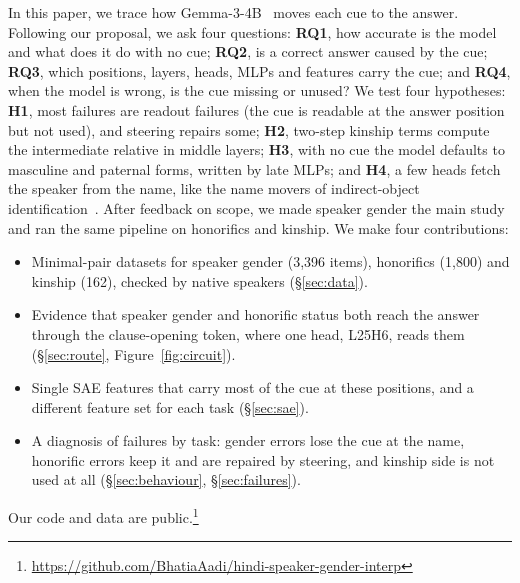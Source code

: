 \documentclass[11pt]{article}
\begin{document}
In this paper, we trace how Gemma-3-4B~\cite{gemma3} moves each cue to the answer. Following our proposal, we ask four questions: \textbf{RQ1}, how accurate is the model and what does it do with no cue; \textbf{RQ2}, is a correct answer caused by the cue; \textbf{RQ3}, which positions, layers, heads, MLPs and features carry the cue; and \textbf{RQ4}, when the model is wrong, is the cue missing or unused? We test four hypotheses: \textbf{H1}, most failures are readout failures (the cue is readable at the answer position but not used), and steering repairs some; \textbf{H2}, two-step kinship terms compute the intermediate relative in middle layers; \textbf{H3}, with no cue the model defaults to masculine and paternal forms, written by late MLPs; and \textbf{H4}, a few heads fetch the speaker from the name, like the name movers of indirect-object identification~\cite{wang2022}. After feedback on scope, we made speaker gender the main study and ran the same pipeline on honorifics and kinship. We make four contributions:
\begin{itemize}[leftmargin=*,itemsep=1pt,topsep=2pt]
\item Minimal-pair datasets for speaker gender (3,396 items), honorifics (1,800) and kinship (162), checked by native speakers (\S\ref{sec:data}).
\item Evidence that speaker gender and honorific status both reach the answer through the clause-opening token, where one head, L25H6, reads them (\S\ref{sec:route}, Figure~\ref{fig:circuit}).
\item Single SAE features that carry most of the cue at these positions, and a different feature set for each task (\S\ref{sec:sae}).
\item A diagnosis of failures by task: gender errors lose the cue at the name, honorific errors keep it and are repaired by steering, and kinship side is not used at all (\S\ref{sec:behaviour}, \S\ref{sec:failures}).
\end{itemize}
Our code and data are public.\footnote{\url{https://github.com/BhatiaAadi/hindi-speaker-gender-interp}}
\end{document}
